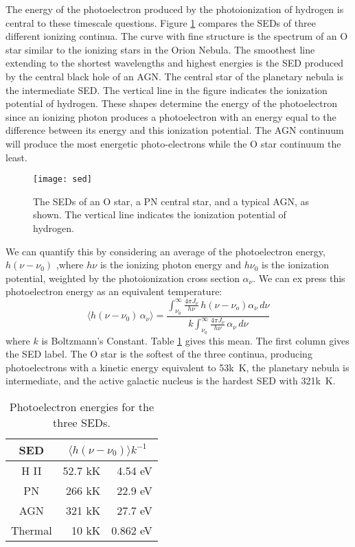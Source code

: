 \documentclass[debug, preprint, twocolumn]{rmaa}
\begin{document}
The energy of the  photoelectron produced by the photoionization of hydrogen
is central to these timescale questions. Figure \ref{fig:sed} compares the
 SEDs of three different ionizing continua.
The curve with fine structure is the spectrum of an O star 
similar to the ionizing stars in the Orion Nebula. 
The smoothest line extending to the shortest wavelengths and highest energies 
is the SED produced by the central black hole of an AGN. 
The central star of the planetary nebula is the intermediate SED. 
The vertical line in the figure indicates the ionization potential of hydrogen. 
These shapes determine the energy of the photoelectron 
since an ionizing photon produces a photoelectron with an energy equal to the 
difference between its energy and this ionization potential. 
The AGN continuum will produce the most energetic photo-electrons while 
the O star continuum the least.

\begin{figure}[t]
\texttt{[image: sed]}
\caption[Three SEDs]{The SEDs of an O star, a PN central star, and a typical AGN,
as shown.  The vertical line indicates the ionization potential of hydrogen.
\label{fig:sed}}
\end{figure}

We can quantify this  by considering an average of the photoelectron energy,
$h ( \nu - \nu_0)$ ,where $h \nu$ is the ionizing photon energy and  $h \nu_0$
is the ionization potential, 
weighted by the photoionization cross section $\alpha_{\nu}$.
We can ex
press this photoelectron energy as 
an equivalent temperature:
\begin{equation}
\langle h (\nu - \nu_0 )\,  \alpha_\nu \rangle  = \frac{\int_{\nu_0}^{\infty}\frac{4 \pi J_{\nu}}{{h\nu}}\, h(\nu - \nu_o) \alpha_\nu\, d\nu}
{k \int_{\nu_0}^{\infty}\frac{4 \pi J_{\nu}}{{h\nu}}\, \alpha_\nu\, d\nu}
\end{equation}
where $k$ is Boltzmann's Constant.
Table \ref{tab:PhotoElectronEnergy} gives this mean. 
The first column gives the SED label.
The O star is the softest of the three continua, producing photoelectrons with a
kinetic energy equivalent to 53k~K,
the planetary nebula is intermediate,
and the active galactic nucleus is the hardest SED with  321k~K. 

\begin{table}
\centering
\caption{Photoelectron energies for the three SEDs.}
\label{tab:PhotoElectronEnergy}
\null\smallskip
\renewcommand\arraystretch{0.65}
\begin{tabular}{ c r r}
\hline
SED&\multicolumn{2}{c}{$\langle h(\nu-\nu_0) \rangle k^{-1}$}\\
\hline
H II & 52.7 kK &  4.54 eV\\
PN   & 266  kK & 22.9 eV\\
AGN  & 321  kK & 27.7 eV\\
\hline
Thermal&10 kK & 0.862 eV\\
\hline
\end{tabular}
\end{table}
\end{document}
